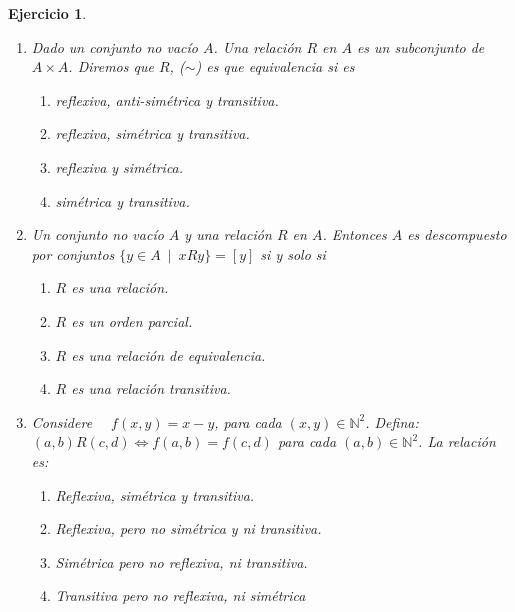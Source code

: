 \documentclass[twoside,12pt,a4 paper,openright]{book}
\newtheorem{ejer}[claim]{Ejercicio}
\begin{document}
\begin{ejer}
\begin{enumerate}
     

\newpage



 

\item Dado un conjunto no vac\'io $A$. Una relaci\'on $R$ en $A$ es un subconjunto de $A\times A$.   Diremos que $R$, ($\sim$) es que equivalencia si es    
{\small
\begin{enumerate}
 \item[\textcolor{red}{$\bullet$}] {} reflexiva,   anti-sim\'etrica y transitiva.
  \item[\textcolor{blue}{$\bullet$}] {}  reflexiva,   sim\'etrica y transitiva.
\item[\textcolor{yellow}{$\bullet$}] {} reflexiva y   sim\'etrica.
\item[\textcolor{green}{$\bullet$}] {} sim\'etrica y transitiva.
  \end{enumerate}
}



\newpage




\item Un  conjunto no vac\'io $A$ y  una relaci\'on $R$ en $A$. Entonces $A$ es descompuesto 
por conjuntos $ \{ y\in A \ \mid \ x R y\} = [y]$   si y solo si 
{\small
\begin{enumerate}
 \item[\textcolor{red}{$\bullet$}] {}  $R$ es una relaci\'on.
\item[\textcolor{blue}{$\bullet$}] {}  $R$ es un orden parcial.
\item[\textcolor{yellow}{$\bullet$}] {} $R$ es una relaci\'on de equivalencia.
\item[\textcolor{green}{$\bullet$}] {}  $R$ es una relaci\'on transitiva.
\end{enumerate}
}



\newpage


\item Considere $\quad f(x,y) = x-y$, para cada $(x,y)\in \mathbb N^2$. Defina:  
        $(a,b)R(c,d) \Leftrightarrow f(a,b) = f(c,d)$ para cada $(a,b)\in \mathbb N^2$. La relaci\'on es:
        {\small
           \begin{enumerate}         
           \item[\textcolor{red}{$\bullet$}] {} Reflexiva, sim\'etrica y transitiva.
        \item[\textcolor{blue}{$\bullet$}] {} Reflexiva, pero no sim\'etrica y ni transitiva.
        \item[\textcolor{yellow}{$\bullet$}] {} Sim\'etrica pero no reflexiva, ni transitiva.
        \item[\textcolor{green}{$\bullet$}] {} Transitiva pero no reflexiva, ni sim\'etrica
    \end{enumerate}
}




\end{enumerate}
\end{ejer}
\end{document}
